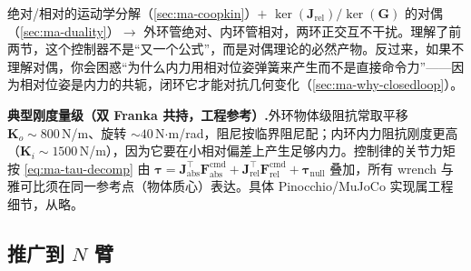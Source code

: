 \begin{insight}
绝对/相对的运动学分解（\cref{sec:ma-coopkin}）$+$ $\ker(\mathbf{J}_{\text{rel}})/\ker(\mathbf{G})$ 的对偶（\cref{sec:ma-duality}）$\to$ 外环管绝对、内环管相对，两环正交互不干扰。理解了前两节，这个控制器不是“又一个公式”，而是对偶理论的必然产物。反过来，如果不理解对偶，你会困惑“为什么内力用相对位姿弹簧来产生而不是直接命令力”——因为相对位姿是内力的共轭，闭环它才能对抗几何变化（\cref{sec:ma-why-closedloop}）。
\end{insight}

\begin{note}
\textbf{典型刚度量级（双 Franka 共持，工程参考）.}\;外环物体级阻抗常取平移 $\mathbf{K}_o\sim800$\,N/m、旋转 $\sim40$\,N$\cdot$m/rad，阻尼按临界阻尼配；内环内力阻抗刚度更高（$\mathbf{K}_i\sim1500$\,N/m），因为它要在小相对偏差上产生足够内力。控制律的关节力矩按 \cref{eq:ma-tau-decomp} 由 $\boldsymbol{\tau}=\mathbf{J}_{\text{abs}}^\top\mathbf{F}_{\text{abs}}^{\text{cmd}}+\mathbf{J}_{\text{rel}}^\top\mathbf{F}_{\text{rel}}^{\text{cmd}}+\boldsymbol{\tau}_{\text{null}}$ 叠加，所有 wrench 与雅可比须在同一参考点（物体质心）表达。具体 Pinocchio/MuJoCo 实现属工程细节，从略。
\end{note}

\subsection{推广到 \texorpdfstring{$N$}{N} 臂}
\label{sec:ma-narm}

